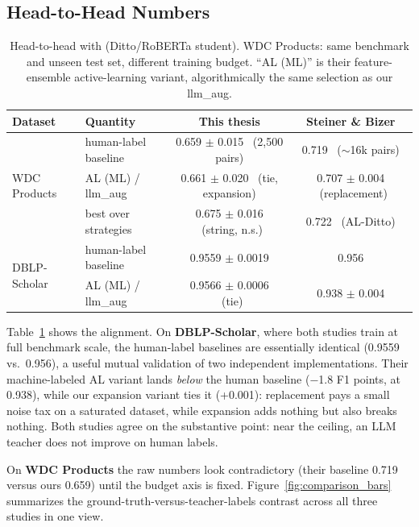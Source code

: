 \documentclass[a4paper,oneside,bibliography=totoc]{scrbook}
\begin{document}
\subsection{Head-to-Head Numbers}
\label{sec:comp_aaron_results}

\begin{table}[!htbp]
  \centering
  \footnotesize
  \setlength{\tabcolsep}{3pt}
  \begin{tabular}{llcc}
    \toprule
    \textbf{Dataset} & \textbf{Quantity} & \textbf{This thesis} & \textbf{Steiner \& Bizer} \\
    \midrule
    \multirow{3}{*}{WDC Products}
      & human-label baseline & 0.659 $\pm$ 0.015 \ (2{,}500 pairs) & 0.719 \ ($\sim$16k pairs) \\
      & AL (ML) / llm\_aug & 0.661 $\pm$ 0.020 \ (tie, expansion) & 0.707 $\pm$ 0.004 \ (replacement) \\
      & best over strategies & 0.675 $\pm$ 0.016 \ (string, n.s.) & 0.722 \ (AL-Ditto) \\
    \midrule
    \multirow{2}{*}{DBLP-Scholar}
      & human-label baseline & 0.9559 $\pm$ 0.0019 & 0.956 \\
      & AL (ML) / llm\_aug & 0.9566 $\pm$ 0.0006 \ (tie) & 0.938 $\pm$ 0.004 \\
    \bottomrule
  \end{tabular}
  \caption{Head-to-head with \citet{steiner2026labeling} (Ditto/RoBERTa student). WDC Products: same benchmark and unseen test set, different training budget. ``AL (ML)'' is their feature-ensemble active-learning variant, algorithmically the same selection as our llm\_aug.}
  \label{tab:comp_aaron}
\end{table}

Table~\ref{tab:comp_aaron} shows the alignment. On \textbf{DBLP-Scholar}, where both studies train at full benchmark scale, the human-label baselines are essentially identical (0.9559 vs.\ 0.956), a useful mutual validation of two independent implementations. Their machine-labeled AL variant lands \emph{below} the human baseline ($-$1.8 F1 points, at 0.938), while our expansion variant ties it (+0.001): replacement pays a small noise tax on a saturated dataset, while expansion adds nothing but also breaks nothing. Both studies agree on the substantive point: near the ceiling, an LLM teacher does not improve on human labels.

On \textbf{WDC Products} the raw numbers look contradictory (their baseline 0.719 versus ours 0.659) until the budget axis is fixed. Figure~\ref{fig:comparison_bars} summarizes the ground-truth-versus-teacher-labels contrast across all three studies in one view.
\end{document}
